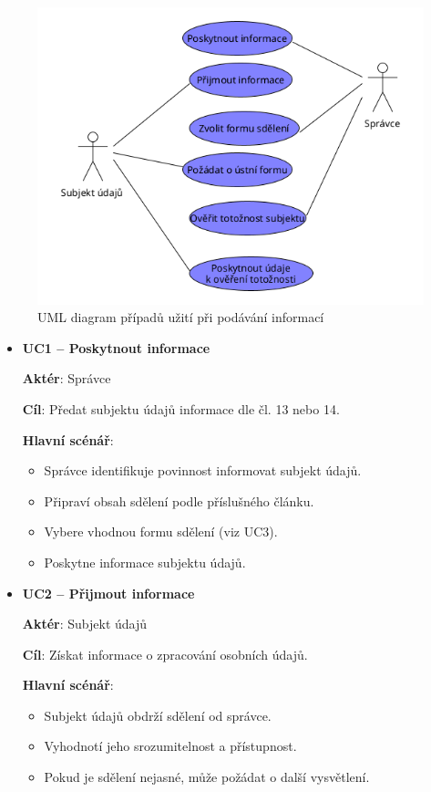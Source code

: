 \begin{itemize}
  
  \begin{figure}[H]
    \centering
    \includegraphics[width=\textwidth]{images/UML_usecase_informace.png}
    \caption{UML diagram případů užití při podávání informací}
    \label{fig:uml_usecase_informace}
  \end{figure}

  \begin{itemize}
    \item \textbf{UC1 – Poskytnout informace}

    \textbf{Aktér}: Správce

    \textbf{Cíl}: Předat subjektu údajů informace dle čl. 13 nebo 14.

    \textbf{Hlavní scénář}:
    \begin{itemize}
        \item Správce identifikuje povinnost informovat subjekt údajů.
        \item Připraví obsah sdělení podle příslušného článku.
        \item Vybere vhodnou formu sdělení (viz UC3).
        \item Poskytne informace subjektu údajů.
    \end{itemize}

    \item \textbf{UC2 – Přijmout informace}

    \textbf{Aktér}: Subjekt údajů

    \textbf{Cíl}: Získat informace o zpracování osobních údajů.

    \textbf{Hlavní scénář}:
    \begin{itemize}
        \item Subjekt údajů obdrží sdělení od správce.
        \item Vyhodnotí jeho srozumitelnost a přístupnost.
        \item Pokud je sdělení nejasné, může požádat o další vysvětlení.
    \end{itemize}


\end{itemize}
\end{itemize}
